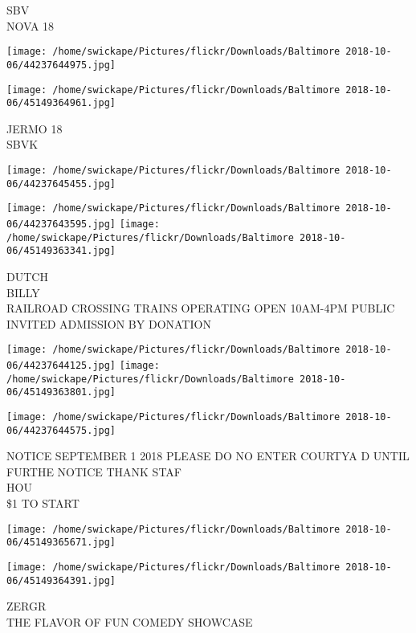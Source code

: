 \documentclass[10pt,letterpaper]{article}
\begin{document}
SBV\\
NOVA 18\\
\pagebreak

\texttt{[image: /home/swickape/Pictures/flickr/Downloads/Baltimore 2018-10-06/44237644975.jpg]}

\vspace{0.25in}
\texttt{[image: /home/swickape/Pictures/flickr/Downloads/Baltimore 2018-10-06/45149364961.jpg]}

JERMO 18\\
SBVK\\
\pagebreak

\texttt{[image: /home/swickape/Pictures/flickr/Downloads/Baltimore 2018-10-06/44237645455.jpg]}

\vspace{0.25in}
\texttt{[image: /home/swickape/Pictures/flickr/Downloads/Baltimore 2018-10-06/44237643595.jpg]}
\texttt{[image: /home/swickape/Pictures/flickr/Downloads/Baltimore 2018-10-06/45149363341.jpg]}

DUTCH\\
BILLY\\
RAILROAD CROSSING TRAINS OPERATING OPEN 10AM{-}4PM PUBLIC INVITED ADMISSION BY DONATION\\
\pagebreak

\texttt{[image: /home/swickape/Pictures/flickr/Downloads/Baltimore 2018-10-06/44237644125.jpg]}
\texttt{[image: /home/swickape/Pictures/flickr/Downloads/Baltimore 2018-10-06/45149363801.jpg]}

\texttt{[image: /home/swickape/Pictures/flickr/Downloads/Baltimore 2018-10-06/44237644575.jpg]}

NOTICE SEPTEMBER 1 2018 PLEASE DO NO ENTER COURTYA D UNTIL FURTHE NOTICE THANK STAF\\
HOU\\
\$1 TO START\\
\pagebreak

\texttt{[image: /home/swickape/Pictures/flickr/Downloads/Baltimore 2018-10-06/45149365671.jpg]}

\vspace{0.25in}
\texttt{[image: /home/swickape/Pictures/flickr/Downloads/Baltimore 2018-10-06/45149364391.jpg]}

ZERGR\\
THE FLAVOR OF FUN COMEDY SHOWCASE\\
\pagebreak
\end{document}

